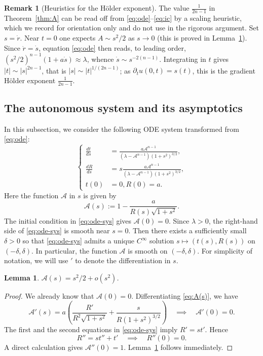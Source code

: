 \documentclass[12pt,letterpaper]{amsart}
\theoremstyle{definition}
\newtheorem{remark}[definition]{Remark}
\theoremstyle{plain}
\newtheorem{lemma}[definition]{Lemma}
\numberwithin{equation}{section}
\begin{document}
\begin{remark}[Heuristics for the H\"older exponent]\label{rk:heuristic}
    The value $\tfrac1{2n-1}$ in Theorem~\ref{thm:A} can be read off from
    \eqref{eq:ode}--\eqref{eq:ic} by a scaling heuristic, which we record for orientation only
    and do not use in the rigorous argument. Set $s=\dot r$. Near $t=0$ one expects
    $A\sim s^2/2$ as $s\to0$ (this is proved in Lemma~\ref{lem:A}). Since $\ddot r=\dot s$,
    equation \eqref{eq:ode} then reads, to leading order,
    $(s^2/2)^{n-1}(1+a\dot s)\approx\lambda$, whence $\dot s\sim s^{-2(n-1)}$. Integrating in
    $t$ gives $|t|\sim|s|^{2n-1}$, that is $|s|\sim|t|^{1/(2n-1)}$; as $\partial_t u(0,t)=s(t)$,
    this is the gradient H\"older exponent $\tfrac1{2n-1}$.
\end{remark}

\subsection{The autonomous system and its asymptotics}\label{ss:system}

In this subsection, we consider the following ODE system transformed from \eqref{eq:ode}:
\begin{equation}\label{eq:ode-sys}
    \left\{
        \begin{aligned}
            \frac{dt}{ds}&=\frac{a\mathcal{A}^{n-1}}{(\lambda-\mathcal{A}^{n-1})(1+s^2)^{3/2}},\\
            \frac{dR}{ds}&=s\frac{a\mathcal{A}^{n-1}}{(\lambda-\mathcal{A}^{n-1})(1+s^2)^{3/2}},\\
            t(0)&=0,R(0)=a.
        \end{aligned}
    \right.
\end{equation}
Here the function $\mathcal{A}$ in $s$ is given by
\begin{equation}\label{eq:A(s)}
    \mathcal{A}(s):=1-\frac{a}{R(s)\sqrt{1+s^2}}.
\end{equation}
The initial condition in \eqref{eq:ode-sys} gives $\mathcal{A}(0)=0$.
Since $\lambda>0$, the right-hand side of \eqref{eq:ode-sys} is smooth near $s=0$.
Then there exists a sufficiently small $\delta>0$ so that \eqref{eq:ode-sys} admits a unique $C^\infty$ solution $s\mapsto(t(s),R(s))$ on $(-\delta,\delta)$.
In particular, the function $\mathcal{A}$ is smooth on $(-\delta,\delta)$.
For simplicity of notation, we will use $'$ to denote the differentiation in $s$.

\begin{lemma}\label{lem:A}
    $\mathcal{A}(s)=s^2/2+o(s^2)$.
\end{lemma}
\begin{proof}
    We already know that $\mathcal{A}(0)=0$.
    Differentiating \eqref{eq:A(s)}, we have
    \[
    \mathcal{A}'(s)=a\left(\frac{R'}{R^2\sqrt{1+s^2}}+\frac{s}{R(1+s^2)^{3/2}}\right)\quad\implies\quad\mathcal{A}'(0)=0.
    \]
    The first and the second equations in \eqref{eq:ode-sys} imply $R'=st'$.
    Hence
    \[
    R''=st''+t'\quad\implies\quad R''(0)=0.
    \]
    A direct calculation gives $\mathcal{A}''(0)=1$.
    Lemma~\ref{lem:A} follows immediately.
\end{proof}
\end{document}
